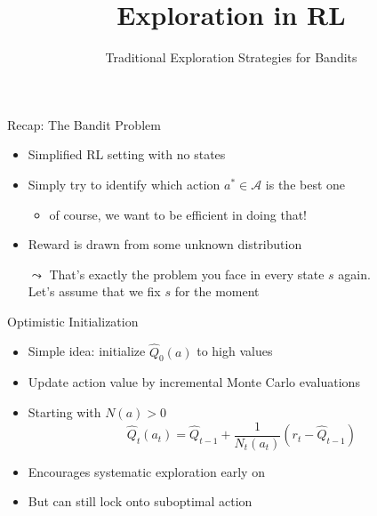 


\title[RL: Exploration]{Exploration in RL}
\subtitle{Traditional Exploration Strategies for Bandits}




	
	\maketitle

\begin{frame}[c]{Recap: The Bandit Problem}

\begin{itemize}
	\item Simplified RL setting with no states
	\item Simply try to identify which action $a^* \in \mathcal{A}$ is the best one
	\begin{itemize}
		\item of course, we want to be efficient in doing that!
	\end{itemize}
	\item Reward is drawn from some unknown distribution
	\bigskip
	\pause
	\item[$\leadsto$] That's exactly the problem you face in every state $s$ again.\\ Let's assume that we fix $s$ for the moment
\end{itemize}

\end{frame}
\begin{frame}[c]{Optimistic Initialization}
	
	\begin{itemize}
		\item Simple idea: initialize $\hat{Q}_0(a)$ to high values
		\item Update action value by incremental Monte Carlo evaluations
		\item Starting with $N(a) > 0$
		$$\hat{Q}_t(a_t) = \hat{Q}_{t-1} + \frac{1}{N_t(a_t)} (r_t - \hat{Q}_{t-1})$$
		\item Encourages systematic exploration early on
		\item But can still lock onto suboptimal action
	\end{itemize}
	
\end{frame}
